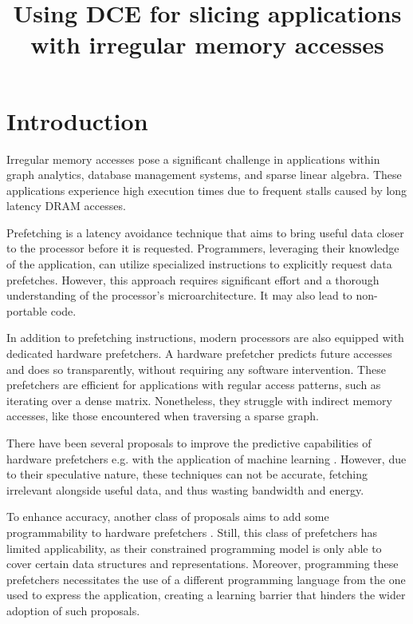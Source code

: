\documentclass{acaces}
\begin{document}
\title{Using DCE for slicing applications with irregular memory accesses}

\pagestyle{empty}

\begin{abstract}

\end{abstract}


\section{Introduction}

Irregular memory accesses pose a significant challenge in applications within graph analytics, database management systems, and sparse linear algebra.
These applications experience high execution times due to frequent stalls caused by long latency DRAM accesses.

Prefetching is a latency avoidance technique that aims to bring useful data closer to the processor before it is requested.
Programmers, leveraging their knowledge of the application, can utilize specialized instructions to explicitly request data prefetches.
However, this approach requires significant effort and a thorough understanding of the processor's microarchitecture.
It may also lead to non-portable code.

In addition to prefetching instructions, modern processors are also equipped with dedicated hardware prefetchers.
A hardware prefetcher predicts future accesses and does so transparently, without requiring any software intervention.
These prefetchers are efficient for applications with regular access patterns, such as iterating over a dense matrix.
Nonetheless, they struggle with indirect memory accesses, like those encountered when traversing a sparse graph.

There have been several proposals to improve the predictive capabilities of hardware prefetchers e.g. with the application of machine learning \cite{bera_pythia_2021}.
However, due to their speculative nature, these techniques can not be accurate, fetching irrelevant alongside useful data, and thus wasting bandwidth and energy.

To enhance accuracy, another class of proposals aims to add some programmability to hardware prefetchers \cite{basak_analysis_2019, talati_prodigy_2021, yang_spzip_2021}.
Still, this class of prefetchers has limited applicability, as their constrained programming model is only able to cover certain data structures and representations.
Moreover, programming these prefetchers necessitates the use of a different programming language from the one used to express the application,
creating a learning barrier that hinders the wider adoption of such proposals.
\end{document}
